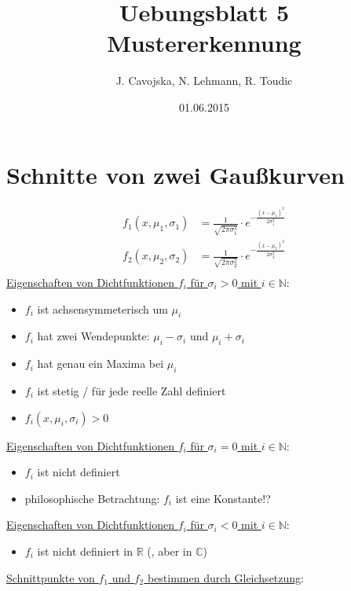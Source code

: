 \documentclass[12pt]{article}
\title{Uebungsblatt 5\\ \glqq Mustererkennung\grqq}
\author{J. Cavojska, N. Lehmann, R. Toudic}
\date{01.06.2015}
\begin{document}
\maketitle
\tableofcontents
\newpage

\section{Schnitte von zwei Gau\ss kurven}

\begin{align*}
f_1(x,\mu_1,\sigma_1) &= \frac{1}{\sqrt{2 \pi \sigma_1^2}} \cdot e^{-\frac{(x-\mu_1)^2}{2 \sigma_1^2}}\\
f_2(x,\mu_2,\sigma_2) &= \frac{1}{\sqrt{2 \pi \sigma_2^2}} \cdot e^{-\frac{(x-\mu_2)^2}{2 \sigma_2^2}}\\
\end{align*}
\underline{Eigenschaften von Dichtfunktionen $f_i$ f\"ur $\sigma_i > 0$ mit $i \in \mathbb{N}$}:
\begin{itemize}
\item $f_i$ ist achsensymmeterisch um $\mu_i$
\item $f_i$ hat zwei Wendepunkte: $\mu_i - \sigma_i$ und $\mu_i + \sigma_i$
\item $f_i$ hat genau ein Maxima bei $\mu_i$
\item $f_i$ ist stetig / f\"ur jede reelle Zahl definiert
\item $f_i(x,\mu_i,\sigma_i) > 0$
\end{itemize}
\underline{Eigenschaften von Dichtfunktionen $f_i$ f\"ur $\sigma_i = 0$ mit $i \in \mathbb{N}$}:
\begin{itemize}
\item $f_i$ ist nicht definiert
\item philosophische Betrachtung: $f_i$ ist eine Konstante!?
\end{itemize}
\underline{Eigenschaften von Dichtfunktionen $f_i$ f\"ur $\sigma_i < 0$ mit $i \in \mathbb{N}$}:
\begin{itemize}
\item $f_i$ ist nicht definiert in $\mathbb{R}$ (, aber in $\mathbb{C}$)
\end{itemize}
\newpage
\underline{Schnittpunkte von $f_1$ und $f_2$ bestimmen durch Gleichsetzung}:
\end{document}
